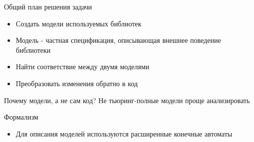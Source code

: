 \documentclass[12pt]{beamer}
\begin{document}
{
\begin{frame}{Общий план решения задачи}
\begin{mybox}[]
\begin{itemize}
	\item Создать модели используемых библиотек
	\item Модель - частная спецификация, описывающая внешнее поведение библиотеки
	\item Найти соответствие между двумя моделями
	\item Преобразовать изменения обратно в код
\end{itemize}
\end{mybox}

\begin{alertblock}{Почему модели, а не сам код?}
Не тьюринг-полные модели проще анализировать
\end{alertblock}
\end{frame}
}

\begin{frame}[fragile]{Формализм}
  \begin{mybox}[]
  \begin{itemize}
  	\item Для описания моделей используются расширенные конечные автоматы
  \end{itemize}
  \end{mybox}
\end{frame}

\end{document}
